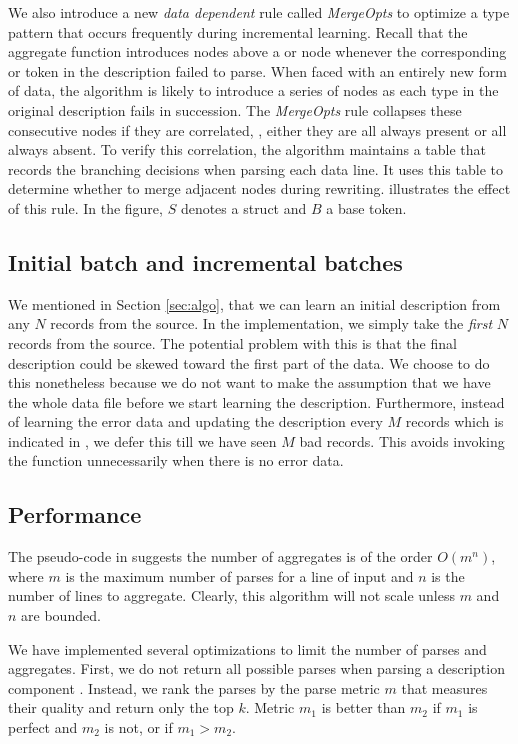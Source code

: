 We also introduce a new {\em data dependent} rule called {\em MergeOpts}
to optimize a type pattern that occurs frequently during incremental
learning.  Recall that the aggregate function
introduces  nodes above a  or  node 
whenever the corresponding  or  token in 
the description failed to 
parse. When faced with an entirely new form of data, 
the algorithm is likely to introduce a series of  nodes as
each type in the original description fails in succession. 
The {\em MergeOpts} rule collapses these consecutive  nodes if they
are correlated, \ie{}, either they are all always present or all always
absent.  To verify this correlation, the algorithm maintains a
table that records the branching decisions when parsing each
data line. It uses this table to determine whether to merge
adjacent  nodes during rewriting. 
 illustrates the effect of this rule.  In the figure,
$S$ denotes a struct and $B$ a base token.

\subsection{Initial batch and incremental batches}
We mentioned in Section \ref{sec:algo}, that we can learn an initial
description from any $N$ records from the source. In the implementation,
we simply take the {\em first} $N$ records from the source. The potential
problem with this
is that the final description could be skewed toward the first part of the
data. We choose to do this nonetheless because we do not want to make 
the assumption that we have the whole data file before we start learning
the description.  Furthermore, instead of learning the error data and 
updating the description every $M$ records which is indicated in 
, we defer this till we have seen $M$ bad records.
 This avoids invoking the  function unnecessarily when
there is no error data.

\subsection{Performance}
The pseudo-code in  suggests the number of
aggregates is of the order $O(m ^ n)$, where $m$ is the maximum number of
parses for a line of input  and $n$ is the number of lines to
aggregate.  Clearly, this algorithm will not scale 
unless $m$ and $n$ are bounded.

We have implemented several optimizations to limit the number of 
parses and aggregates. First, we do not return all possible
parses when parsing a description component . 
Instead, we rank the parses by the parse metric $m$ that
measures their quality and return only the top $k$. 
Metric $m_1$ is better than $m_2$ if $m_1$ is perfect and $m_2$ is not, 
or if $m_1 > m_2$.

